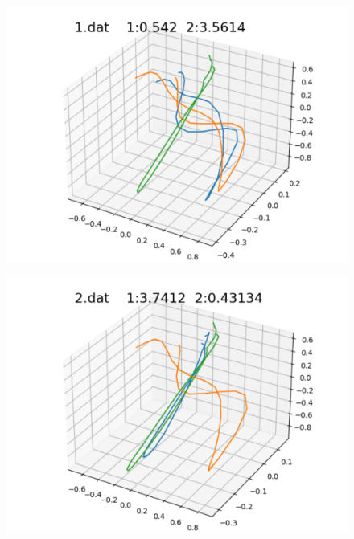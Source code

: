 \begin{figure}[h]
 \begin{minipage}[b]{0.32\linewidth}
  \centering
  \includegraphics[keepaspectratio, scale=0.3]
  {./pic/level2/1_dat.pdf}
  \label{1dat}
 \end{minipage}
 \begin{minipage}[b]{0.32\linewidth}
  \centering
  \includegraphics[keepaspectratio, scale=0.3]
  {./pic/level2/2_dat.pdf}
  \label{2dat}
 \end{minipage}
 \begin{minipage}[b]{0.32\linewidth}
  \centering

\end{minipage}
\end{figure}
